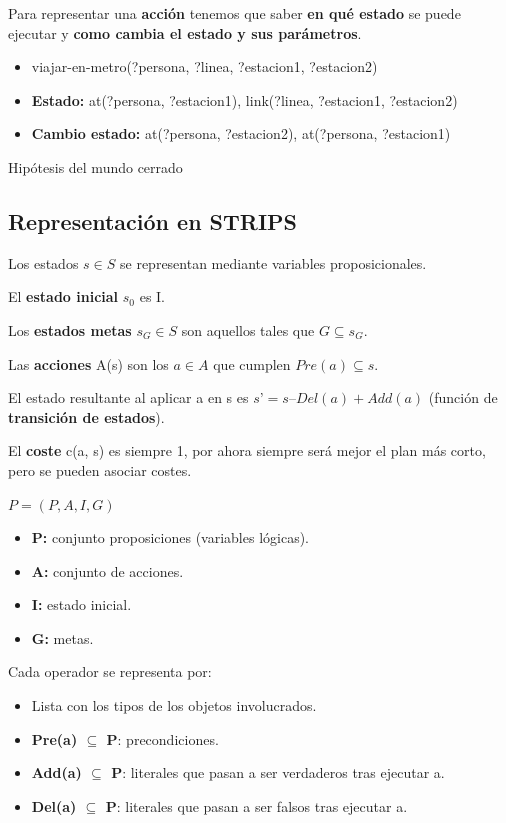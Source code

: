 \documentclass[12pt, twoside, openright]{report} %
\begin{document}
Para representar una \textbf{acción} tenemos que saber \textbf{en qué estado} se puede ejecutar y \textbf{como cambia el estado y sus parámetros}.
\begin{itemize}
	\item viajar-en-metro(?persona, ?linea, ?estacion1, ?estacion2)
	\item \textbf{Estado:} at(?persona, ?estacion1), link(?linea, ?estacion1, ?estacion2)
	\item \textbf{Cambio estado:} at(?persona, ?estacion2), at(?persona, ?estacion1)
\end{itemize}

Hipótesis del mundo cerrado

\subsection{Representación en STRIPS}
Los estados $s \in S$ se representan mediante variables proposicionales.

El \textbf{estado inicial} $s_0$ es I.

Los \textbf{estados metas} $s_G \in S$ son aquellos tales que $G \subseteq s_G$.

Las \textbf{acciones} A(s) son los $a \in A$ que cumplen $Pre(a) \subseteq s$.

El estado resultante al aplicar a en s es $s’ = s – Del(a) + Add(a)$ (función de \textbf{transición de estados}).

El \textbf{coste} c(a, s) es siempre 1, por ahora siempre será mejor el plan más corto, pero se pueden asociar costes.

$P = (P, A, I, G)$
\begin{itemize}
	\item \textbf{P:} conjunto proposiciones (variables lógicas).
	\item \textbf{A:} conjunto de acciones.
	\item \textbf{I:} estado inicial.
	\item \textbf{G:} metas.
\end{itemize}

Cada operador se representa por:
\begin{itemize}
	\item Lista con los tipos de los objetos involucrados.
	\item \textbf{Pre(a) $\subseteq$ P}: precondiciones.
	\item \textbf{Add(a) $\subseteq$ P}: literales que pasan a ser verdaderos tras ejecutar a.
	\item \textbf{Del(a) $\subseteq$ P}: literales que pasan a ser falsos tras ejecutar a.
\end{itemize}
\end{document}
